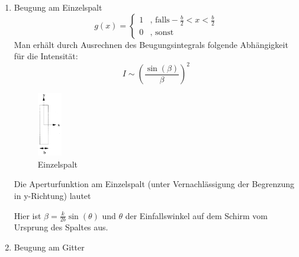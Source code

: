 \begin{enumerate}


\item Beugung am Einzelspalt
$$g(x) = \begin{cases} 
	1 & \text{, falls} -\frac{b}{2}<x<\frac{b}{2}\\
	0 & \text{, sonst}
     \end{cases} $$
Man erh\"alt durch Ausrechnen des Beugungsintegrals folgende Abh\"angigkeit f\"ur die Intensit\"at:
$$ I \sim \left(\frac{\sin(\beta)}{\beta}\right)^2 $$
\begin{figure}
	\begin{center}
		\includegraphics[width=0.1\textwidth]{Bilder/Einzelspalt.jpg}
	\end{center}
	\caption{Einzelspalt}
\end{figure}
Die Aperturfunktion am Einzelspalt (unter Vernachl\"assigung der Begrenzung in y-Richtung) lautet


Hier ist $\beta = \frac{k}{2b}\sin(\theta)$ und $\theta$ der Einfallswinkel auf dem Schirm vom Ursprung des Spaltes aus.


\item Beugung am Gitter





\end{enumerate}